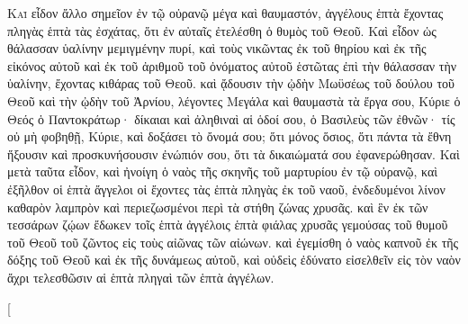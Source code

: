 \begin{pages}
    \begin{Rightside}
        \beginnumbering
		\renewcommand{\LettrineFontHook}{\PHtitl}
		\lettrine[lines=3]{Κ}{αὶ} εἶδον ἄλλο σημεῖον ἐν τῷ οὐρανῷ μέγα καὶ θαυμαστόν, ἀγγέλους ἑπτὰ ἔχοντας πληγὰς ἑπτὰ τὰς ἐσχάτας, ὅτι ἐν αὐταῖς ἐτελέσθη ὁ θυμὸς τοῦ Θεοῦ. Καὶ εἶδον ὡς θάλασσαν ὑαλίνην μεμιγμένην πυρί, καὶ τοὺς νικῶντας ἐκ τοῦ θηρίου καὶ ἐκ τῆς εἰκόνος αὐτοῦ καὶ ἐκ τοῦ ἀριθμοῦ τοῦ ὀνόματος αὐτοῦ ἑστῶτας ἐπὶ τὴν θάλασσαν τὴν ὑαλίνην, ἔχοντας κιθάρας τοῦ Θεοῦ. 
		\pend
		\pstart
		καὶ ᾄδουσιν τὴν ᾠδὴν Μωϋσέως τοῦ δούλου τοῦ Θεοῦ καὶ τὴν ᾠδὴν τοῦ Ἀρνίου, λέγοντες 	Μεγάλα καὶ θαυμαστὰ τὰ ἔργα σου, Κύριε ὁ Θεός ὁ Παντοκράτωρ· δίκαιαι καὶ ἀληθιναὶ αἱ ὁδοί σου, ὁ Βασιλεὺς τῶν ἐθνῶν· τίς οὐ μὴ φοβηθῇ, Κύριε, καὶ δοξάσει τὸ ὄνομά σου; ὅτι μόνος ὅσιος, ὅτι πάντα τὰ ἔθνη ἥξουσιν καὶ προσκυνήσουσιν ἐνώπιόν σου, ὅτι τὰ δικαιώματά σου ἐφανερώθησαν. 
		\pend
		\pstart
		Καὶ μετὰ ταῦτα εἶδον, καὶ ἠνοίγη ὁ ναὸς τῆς σκηνῆς τοῦ μαρτυρίου ἐν τῷ οὐρανῷ, καὶ ἐξῆλθον οἱ ἑπτὰ ἄγγελοι οἱ ἔχοντες τὰς ἑπτὰ πληγὰς ἐκ τοῦ ναοῦ, ἐνδεδυμένοι λίνον καθαρὸν λαμπρὸν καὶ περιεζωσμένοι περὶ τὰ στήθη ζώνας χρυσᾶς. καὶ ἓν ἐκ τῶν τεσσάρων ζῴων ἔδωκεν τοῖς ἑπτὰ ἀγγέλοις ἑπτὰ φιάλας χρυσᾶς γεμούσας τοῦ θυμοῦ τοῦ Θεοῦ τοῦ ζῶντος εἰς τοὺς αἰῶνας τῶν αἰώνων. καὶ ἐγεμίσθη ὁ ναὸς καπνοῦ ἐκ τῆς δόξης τοῦ Θεοῦ καὶ ἐκ τῆς δυνάμεως αὐτοῦ, καὶ οὐδεὶς ἐδύνατο εἰσελθεῖν εἰς τὸν ναὸν ἄχρι τελεσθῶσιν αἱ ἑπτὰ πληγαὶ τῶν ἑπτὰ ἀγγέλων.
		\pend
        \endnumbering
    \end{Rightside}
    \begin{Leftside}
        \beginnumbering
        \pstart[

\end{Leftside}
\end{pages}
